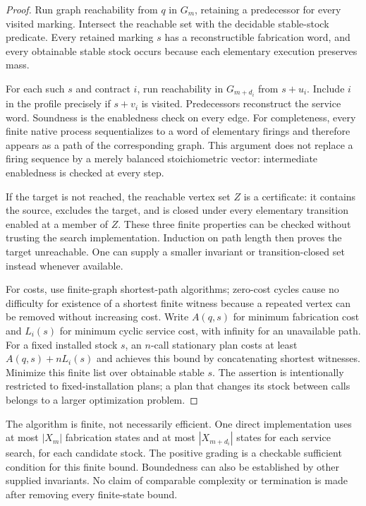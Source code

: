 \documentclass[11pt]{article}
\theoremstyle{definition}
\theoremstyle{remark}
\begin{document}
\begin{proof}
Run graph reachability from $q$ in $G_m$, retaining a predecessor for every visited marking. Intersect the reachable set with the decidable stable-stock predicate. Every retained marking $s$ has a reconstructible fabrication word, and every obtainable stable stock occurs because each elementary execution preserves mass.

For each such $s$ and contract $i$, run reachability in $G_{m+d_i}$ from $s+u_i$. Include $i$ in the profile precisely if $s+v_i$ is visited. Predecessors reconstruct the service word. Soundness is the enabledness check on every edge. For completeness, every finite native process sequentializes to a word of elementary firings and therefore appears as a path of the corresponding graph. This argument does not replace a firing sequence by a merely balanced stoichiometric vector: intermediate enabledness is checked at every step.

If the target is not reached, the reachable vertex set $Z$ is a certificate: it contains the source, excludes the target, and is closed under every elementary transition enabled at a member of $Z$. These three finite properties can be checked without trusting the search implementation. Induction on path length then proves the target unreachable. One can supply a smaller invariant or transition-closed set instead whenever available.

For costs, use finite-graph shortest-path algorithms; zero-cost cycles cause no difficulty for existence of a shortest finite witness because a repeated vertex can be removed without increasing cost. Write $A(q,s)$ for minimum fabrication cost and $L_i(s)$ for minimum cyclic service cost, with infinity for an unavailable path. For a fixed installed stock $s$, an $n$-call stationary plan costs at least $A(q,s)+nL_i(s)$ and achieves this bound by concatenating shortest witnesses. Minimize this finite list over obtainable stable $s$. The assertion is intentionally restricted to fixed-installation plans; a plan that changes its stock between calls belongs to a larger optimization problem.
\end{proof}

The algorithm is finite, not necessarily efficient. One direct implementation uses at most $|X_m|$ fabrication states and at most $|X_{m+d_i}|$ states for each service search, for each candidate stock. The positive grading is a checkable sufficient condition for this finite bound. Boundedness can also be established by other supplied invariants. No claim of comparable complexity or termination is made after removing every finite-state bound.
\end{document}
